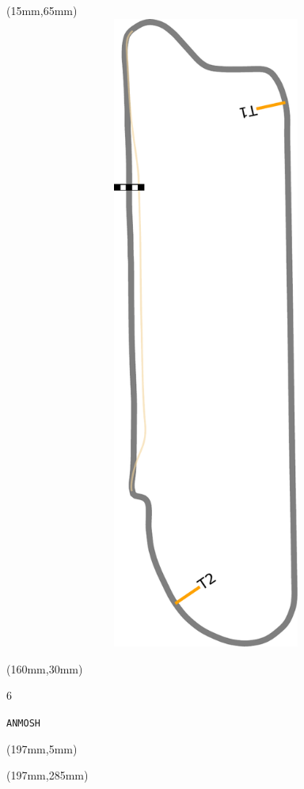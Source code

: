 \begin{textblock*}{185mm}(15mm,65mm)%
\centering
\mbox{\includegraphics[width=185mm,height=210mm,keepaspectratio]{PT/ANMOSH.pdf}}
\end{textblock*}
\begin{textblock*}{40mm}(160mm,30mm)%
\Large
\par{} 
\par6 
\par\hfill\tiny\tt ANMOSH\\
\end{textblock*}
\begin{textblock*}{20mm}(197mm,5mm)%
\fbox{\thepage}
\label{ANMOSH}
\end{textblock*}
\begin{textblock*}{20mm}(197mm,285mm)%
\fbox{\thepage}
\end{textblock*}

